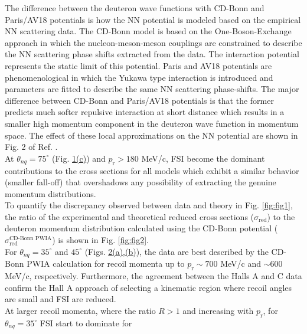 \indent The difference between the deuteron wave functions with CD-Bonn and Paris/AV18 potentials is 
how the NN potential is modeled based on the empirical NN scattering data.
The CD-Bonn model is based on the One-Boson-Exchange approach in which the 
nucleon-meson-meson couplings are constrained to describe the NN scattering phase shifts
extracted from the data. The interaction potential represents the static limit of 
this potential. Paris and AV18 potentials are phenomenological in which the 
Yukawa type interaction is introduced and parameters are fitted to describe the 
same NN scattering phase-shifts. The major difference between CD-Bonn and Paris/AV18 
potentials is that the former predicts much softer repulsive interaction at short distance which 
results in a smaller high momentum component in the deuteron wave function in momentum space.
The effect of these local approximations on the NN potential are shown in Fig. 2 of Ref. \cite{PhysRevC.63.024001}. \\
\indent At $\theta_{nq}=75^{\circ}$ (Fig. \hyperref[fig:fig1]{1(c)}) and $p_{\mathrm{r}}>180$ MeV/c, FSI become the dominant contributions to the cross sections for all models which exhibit a similar
behavior (smaller fall-off) that overshadows any possibility of extracting the genuine momentum distributions.\\
\indent To quantify the discrepancy observed between data and theory in Fig. \ref{fig:fig1}, the ratio of the experimental and theoretical reduced cross sections ($\sigma_{\mathrm{red}}$) to the
deuteron momentum distribution  calculated using the CD-Bonn potential ($\sigma^{\text{CD-Bonn PWIA}}_{\mathrm{red}}$) \cite{PhysRevC.63.024001} is shown in Fig. \ref{fig:fig2}. \\
\indent For $\theta_{nq}=35^{\circ}$ and $45^{\circ}$ (Figs. \hyperref[fig:fig2]{2(a),(b)}), the data are best described by the CD-Bonn PWIA calculation for recoil momenta up
to $p_{\mathrm{r}}\sim700$ MeV/c and $\sim600$ MeV/c, respectively. Furthermore, the agreement between the Halls A and C data confirm the Hall A approach of selecting a kinematic
region where recoil angles are small and FSI are reduced. \\
\indent At larger recoil momenta, where the ratio $R>1$ and increasing with $p_{\mathrm{r}}$, for $\theta_{nq}=35^{\circ}$ FSI start to dominate for

